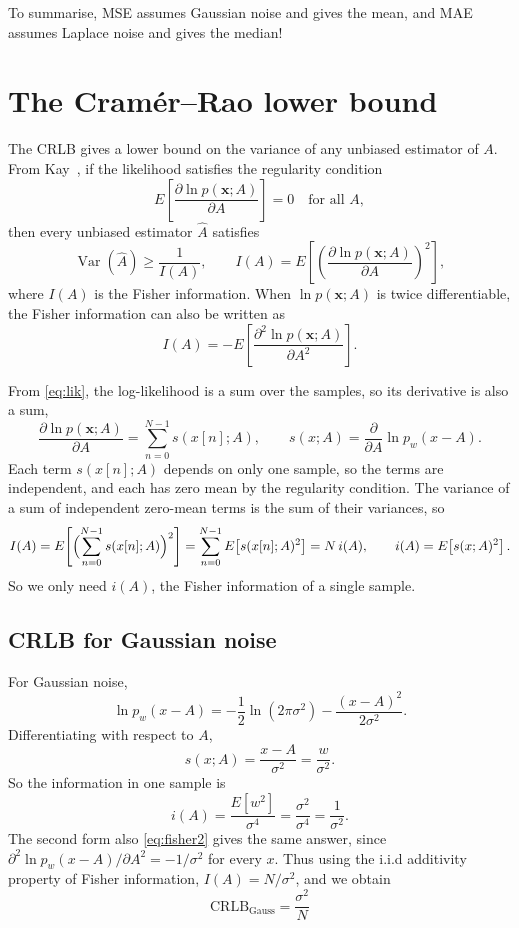 \documentclass[11pt]{article}
\numberwithin{figure}{section}
\numberwithin{equation}{section}
\begin{document}
To summarise, MSE assumes Gaussian noise and gives the mean, and MAE assumes Laplace noise and gives the median!

\section{The Cram\'er--Rao lower bound}
\label{sec:crlb}

The CRLB gives a lower bound on the variance of any unbiased estimator of $A$. From
Kay~\cite[Theorem 3.1]{kay}, if the likelihood satisfies the regularity condition
\[
  E\!\left[\frac{\partial \ln p(\mathbf{x}; A)}{\partial A}\right] = 0 \quad \text{for all } A,
\]
then every unbiased estimator $\hat A$ satisfies
\begin{equation}
  \operatorname{Var}(\hat A) \geq \frac{1}{I(A)}, \qquad
  I(A) = E\!\left[\left(\frac{\partial \ln p(\mathbf{x}; A)}{\partial A}\right)^{2}\right],
  \label{eq:crlb}
\end{equation}
where $I(A)$ is the Fisher information. When $\ln p(\mathbf{x}; A)$ is twice differentiable, the
Fisher information can also be written as
\begin{equation}
  I(A) = -E\!\left[\frac{\partial^2 \ln p(\mathbf{x}; A)}{\partial A^2}\right].
  \label{eq:fisher2}
\end{equation}

From \eqref{eq:lik}, the log-likelihood is a sum over the samples, so its derivative is also a
sum,
\[
  \frac{\partial \ln p(\mathbf{x}; A)}{\partial A} = \sum_{n=0}^{N-1} s(x[n]; A), \qquad
  s(x; A) = \frac{\partial}{\partial A} \ln p_w(x - A).
\]
Each term $s(x[n]; A)$ depends on only one sample, so the terms are independent, and each has
zero mean by the regularity condition. The variance of a sum of independent zero-mean terms is
the sum of their variances, so
\begin{equation}
  I(A) = E\!\left[\Bigl(\sum_{n=0}^{N-1} s(x[n]; A)\Bigr)^{2}\right]
  = \sum_{n=0}^{N-1} E\!\left[s(x[n]; A)^2\right] = N\, i(A), \qquad
  i(A) = E\!\left[s(x; A)^2\right].
  \label{eq:fisher-iid}
\end{equation}
So we only need $i(A)$, the Fisher information of a single sample.

\subsection{CRLB for Gaussian noise}

For Gaussian noise,
\[
  \ln p_w(x - A) = -\frac{1}{2}\ln(2\pi\sigma^2) - \frac{(x-A)^2}{2\sigma^2}.
\]
Differentiating with respect to $A$,
\[
  s(x; A) = \frac{x - A}{\sigma^2} = \frac{w}{\sigma^2}.
\]
So the information in one sample is
\[
  i(A) = \frac{E[w^2]}{\sigma^4} = \frac{\sigma^2}{\sigma^4} = \frac{1}{\sigma^2}.
\]
The second form also \eqref{eq:fisher2} gives the same answer, since
$\partial^2 \ln p_w(x-A)/\partial A^2 = -1/\sigma^2$ for every $x$. Thus using the i.i.d additivity property of Fisher information,
$I(A) = N/\sigma^2$, and we obtain
\[
  \boxed{\text{CRLB}_{\text{Gauss}} = \frac{\sigma^2}{N}}
\]
\end{document}

